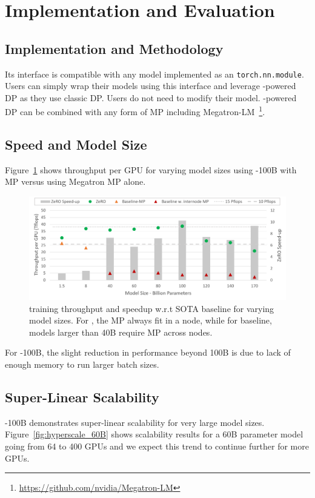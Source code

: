\section{Implementation and Evaluation}\label{sec:evaluation}
  
\subsection{Implementation and Methodology}

Its interface is compatible with any model implemented as an {\tt torch.nn.module}. Users can simply wrap their models using this interface and leverage \name-powered DP as they use classic DP. Users do not need to modify their model.  \name-powered DP can be combined with any form of MP including Megatron-LM~\footnote{\url{https://github.com/nvidia/Megatron-LM}}.

\subsection{Speed and Model Size}
Figure~\ref{fig:billion_parameter_speedup} shows throughput per GPU for varying model sizes using \name-100B with MP versus using Megatron MP alone.

\begin{figure}[t!]
   \begin{center}
   \includegraphics[width=1.0\columnwidth]{model_size_and_speedup.PNG}
   \caption{\name training throughput and speedup w.r.t SOTA baseline for varying model sizes.  For \name, the MP always fit in a node, while for baseline, models larger than 40B require MP across nodes.} 
   \label{fig:billion_parameter_speedup}
   \end{center}
\end{figure}

For \name-100B, the slight reduction in performance beyond 100B is due to lack of enough memory to run larger batch sizes.

\subsection{Super-Linear Scalability}
\name-100B demonstrates super-linear scalability for very large model sizes. Figure~\ref{fig:hyperscale_60B} shows scalability results for a 60B parameter model going from 64 to 400 GPUs and we expect this trend to continue further for more GPUs.

